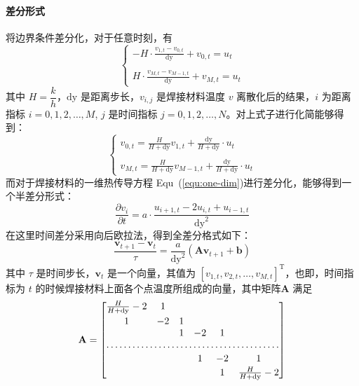 \documentclass[../main.tex]{subfiles}
\begin{document}
\paragraph{差分形式}
将边界条件差分化，对于任意时刻，有
\begin{equation}
\begin{cases}
\displaystyle - H \cdot \frac{v _{1, t}  - v _{0, t}}{\mathrm{dy}} + v_{0 ,t} = u_{t} \\
\\
\displaystyle H \cdot\frac{v_{M , t} - v _{M-1, t}}{\mathrm{dy}} + v_{M,t} = u_{t}
\end{cases}
\end{equation}
其中 \(H = \dfrac{k}{h}\)，\(\mathrm{dy}\) 是距离步长，\(v_{i,j}\) 是焊接材料温度 \(v\) 离散化后的结果，\(i\) 为距离指标 \(i = 0,  1,  2 , \dots , M\), \(j\) 是时间指标 \(j = 0 , 1 , 2 , \dots, N\)。对上式子进行化简能够得到：
\begin{equation}
\begin{cases}
\displaystyle v_{0,t} = \frac{H}{H + \mathrm{dy}} v_{1 ,t} + \frac{\mathrm{dy}}{H + \mathrm{dy}} \cdot u_{t}\\
\\
\displaystyle v_{M,t} = \frac{H}{H + \mathrm{dy}} v _{M-1, t} + \frac{\mathrm{dy}}{H + \mathrm{dy}} \cdot u_{t}
\end{cases}
\end{equation}
而对于焊接材料的一维热传导方程 Equ~(\ref{equ:one-dim})进行差分化，能够得到一个半差分形式：
\begin{equation}
\frac{\partial v _{i}}{\partial t} = a \cdot \frac{u_{i+1, t} - 2 u_{i, t} + u_{i- 1 , t}}{\mathrm{dy} ^{2}}
\end{equation}
在这里时间差分采用向后欧拉法，得到全差分格式如下：
\begin{equation}\label{equ:all}
\frac{\mathbf{v}_{t+1}  - \mathbf{v}_{t}}{\tau}= \frac{a}{\mathrm{dy}^{2}} (\mathbf{A}\mathbf{v} _{t+1} + \mathbf{b})
\end{equation}
其中 \(\tau\) 是时间步长，\(\mathbf{v}_{t}\) 是一个向量，其值为 \([v _{1, t}, v_{2, t}, \dots, v_{M, t}]^{\mathrm{T}}\)，也即，时间指标为 \(t\) 的时候焊接材料上面各个点温度所组成的向量，其中矩阵\(\mathbf A\) 满足
\begin{equation}
\mathbf{A} =
\begin{bmatrix}
\frac{H}{H + \mathrm{dy}} - 2 & 1 &&\\
\\[-10pt]
1 & -2 & 1 &\\
& & 1 & -2 & 1 \\
\hdotsfor{6}\\
\\[-10pt]
&& & 1 & -2 & 1 \\
\\[-10pt]
&& &  & 1 &\frac{H}{H + \mathrm{dy}} -2
\end{bmatrix}
\end{equation}
\end{document}
